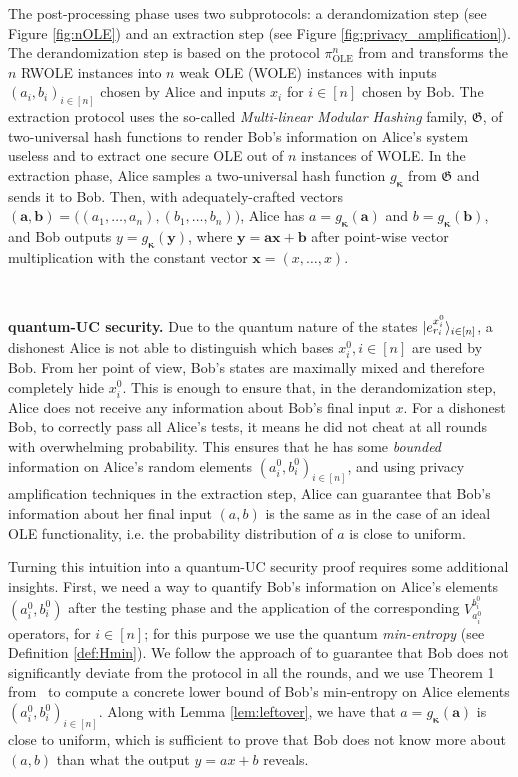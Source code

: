 The post-processing phase uses two subprotocols: a derandomization step (see Figure \ref{fig:nOLE}) and an extraction step (see Figure \ref{fig:privacy_amplification}). The derandomization step is based on the protocol $\pi^n_{\text{OLE}}$ from \cite{DHNO19} and transforms the $n$ RWOLE instances into $n$ weak OLE (WOLE) instances with inputs $(a_i, b_i)_{i\in [n]}$ chosen by Alice and inputs $x_i$ for $i\in [n]$ chosen by Bob. The extraction protocol uses the so-called \textit{Multi-linear Modular Hashing} family, $\mathfrak{G}$, of two-universal hash functions \cite{HK97} to render Bob's information on Alice's system useless and to extract one secure OLE out of $n$ instances of WOLE. In the extraction phase, Alice samples a two-universal hash function $g_{\bm{\kappa}}$ from $\mathfrak{G}$ and sends it to Bob. Then, with adequately-crafted vectors $(\bm{a}, \bm{b}) = \big( (a_1, \ldots, a_n), (b_1, \ldots, b_n) \big)$, Alice has $a = g_{\bm{\kappa}}(\bm{a})$ and $b = g_{\bm{\kappa}}(\bm{b})$, and Bob outputs $y = g_{\bm{\kappa}}(\bm{y})$, where $\bm{y} = \bm{a} \bm{x} + \bm{b}$ after point-wise vector multiplication with the constant vector $\bm{x} = (x, \ldots, x)$. 



\


\noindent\textbf{quantum-UC security.} %
Due to the quantum nature of the states $| e^{x^0_i}_{r_i} \rangle_{i\in [n]}$, a dishonest Alice is not able to distinguish which bases $x^0_i, i\in [n]$ are used by Bob. From her point of view, Bob's states are maximally mixed and therefore completely hide $x^0_i$. This is enough to ensure that, in the derandomization step, Alice does not receive any information about Bob's final input $x$. For a dishonest Bob, to correctly pass all Alice's tests, it means he did not cheat at all rounds with overwhelming probability. This ensures that he  has some \textit{bounded} information on Alice's random elements $(a^0_i, b^0_i)_{i\in [n]}$, and using privacy amplification techniques in the extraction step, Alice can guarantee that Bob's information about her final input $(a,b)$ is the same as in the case of an ideal OLE functionality, i.e. the probability distribution of $a$ is close to uniform.

Turning this intuition into a quantum-UC security proof requires some additional insights. First, we need a way to quantify Bob's information on Alice's elements $(a^0_i, b^0_i)$ after the testing phase and the application of the corresponding $V^{b^0_i}_{a^0_i}$  operators, for $ i\in [n]$; for this purpose we use the quantum \textit{min-entropy} (see Definition \ref{def:Hmin}). We follow the approach of \cite{DFLSS09} to guarantee that Bob does not significantly deviate from the protocol in all the rounds, and we use Theorem 1 from~\cite{Dupuis2015} to compute a concrete lower bound of Bob's min-entropy on Alice elements $(a^0_i, b^0_i)_{i\in [n]}$. Along with Lemma \ref{lem:leftover}, we have that $a = g_{\bm{\kappa}}(\bm{a})$ is close to uniform, which is sufficient to prove that Bob does not know more about $(a,b)$ than what the output $y = ax + b$ reveals. 

